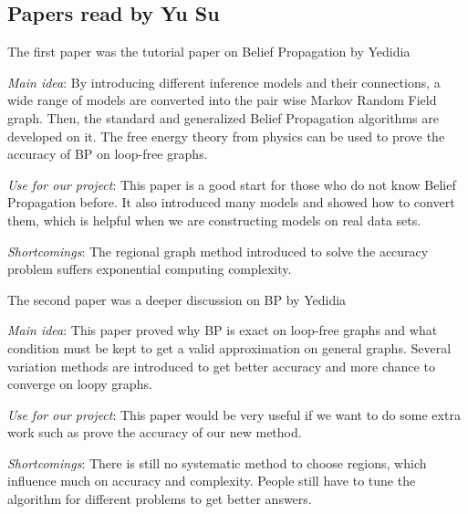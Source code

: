\subsection{Papers read by  Yu Su}
The first paper was the tutorial paper on Belief Propagation by Yedidia
\cite{Yedidia:2003:UBP}
\begin{itemize*}
\item {\em Main idea}:
By introducing different inference models and their connections, a wide range of models are converted into the pair wise Markov Random Field graph. Then, the standard and generalized Belief Propagation algorithms are developed on it. The free energy theory from physics can be used to prove the accuracy of BP on loop-free graphs.

\item {\em Use for our project}:
This paper is a good start for those who do not know Belief Propagation before. It also introduced many models and showed how to convert them, which is helpful when we are constructing models on real data sets.

\item {\em Shortcomings}:
The regional graph method introduced to solve the accuracy problem suffers exponential computing complexity.

\end{itemize*}


The second paper was a deeper discussion on BP by Yedidia
\cite{Yedidia05constructingfree}
\begin{itemize*}
\item {\em Main idea}:
This paper proved why BP is exact on loop-free graphs and what condition must be kept to get a valid approximation on general graphs. Several variation methods are introduced to get better accuracy and more chance to converge on loopy graphs.

\item {\em Use for our project}:
This paper would be very useful if we want to do some extra work such as prove the accuracy of our new method.


\item {\em Shortcomings}:
There is still no systematic method to choose regions, which influence much on accuracy and complexity. People still have to tune the algorithm for different problems to get better answers.

\end{itemize*}


